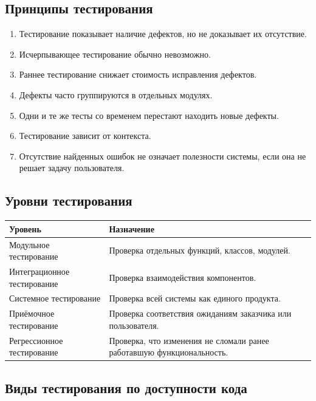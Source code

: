 \documentclass[12pt,a4paper]{article}
\begin{document}
\subsection{Принципы тестирования}

\begin{enumerate}
    \item Тестирование показывает наличие дефектов, но не доказывает их отсутствие.
    \item Исчерпывающее тестирование обычно невозможно.
    \item Раннее тестирование снижает стоимость исправления дефектов.
    \item Дефекты часто группируются в отдельных модулях.
    \item Одни и те же тесты со временем перестают находить новые дефекты.
    \item Тестирование зависит от контекста.
    \item Отсутствие найденных ошибок не означает полезности системы, если она не решает задачу пользователя.
\end{enumerate}

\subsection{Уровни тестирования}

\begin{center}
\begin{tabular}{p{4cm} p{9cm}}
\toprule
\textbf{Уровень} & \textbf{Назначение} \\
\midrule
Модульное тестирование & Проверка отдельных функций, классов, модулей. \\
Интеграционное тестирование & Проверка взаимодействия компонентов. \\
Системное тестирование & Проверка всей системы как единого продукта. \\
Приёмочное тестирование & Проверка соответствия ожиданиям заказчика или пользователя. \\
Регрессионное тестирование & Проверка, что изменения не сломали ранее работавшую функциональность. \\
\bottomrule
\end{tabular}
\end{center}

\subsection{Виды тестирования по доступности кода}
\end{document}
